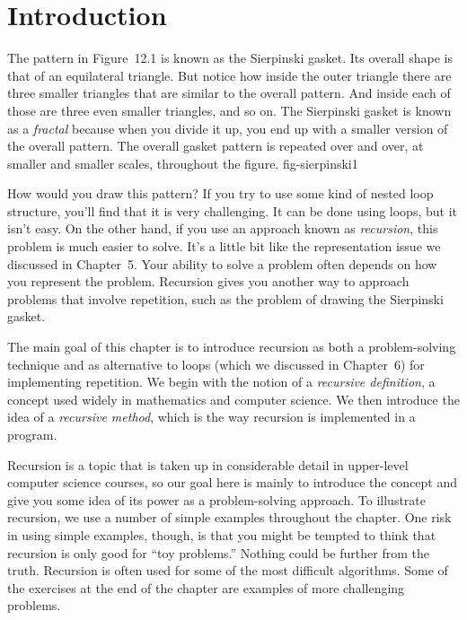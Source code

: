 \section{Introduction}
\label{introduction}
\noindent The pattern in Figure~12.1 is known as the Sierpinski
gasket.  Its overall shape is that of an equilateral triangle.  But
notice how inside the outer triangle there are three smaller
triangles that are similar to the overall pattern.  And inside each of
those are three even smaller triangles, and so on.   The Sierpinski
gasket is known as a {\it fractal} because when you divide it up, you
end up with a smaller version of the overall pattern.  The overall
gasket pattern is repeated over and over, at smaller and smaller
scales, throughout the figure.
  {fig-sierpinski1}


How would you draw this pattern?  If you try to use some kind of
nested loop structure, you'll find that it is very challenging.   It
can be done using loops, but it isn't easy.  On the other hand, if you
use an approach known as {\it recursion}, this problem is much easier
to solve.  It's a little bit like the representation issue we discussed
in Chapter~5. Your ability to solve a problem often
depends on how you represent the problem.  Recursion gives you another
way to approach problems that involve repetition, such as the problem
of drawing the Sierpinski gasket.

The main goal of this chapter is to introduce recursion as both a
problem-solving technique and as alternative to loops
(which we discussed in Chapter~6) for implementing repetition.  We
begin with the notion of a {\it recursive definition}, a concept used
widely in mathematics and computer science.  We then introduce the
idea of a {\it recursive method}, which is the way recursion is implemented
in a program.  

Recursion is a topic that is taken up in considerable detail in
upper-level computer science courses, so our goal here is mainly to
introduce the concept and give you some idea of its power as a
problem-solving approach.  To illustrate recursion, we use a number of
simple examples throughout the chapter.  One risk in using simple
examples, though, is that you might be tempted to think that recursion
is only good for ``toy problems.'' Nothing could be further from the
truth.  Recursion is often used for some of the most difficult
algorithms.  Some of the exercises at the end of the chapter are
examples of more challenging problems.


